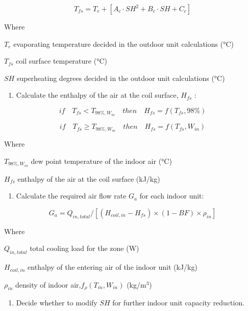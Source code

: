 \begin{equation}
T_{fs} = T_e+[A_c\cdot SH^2+B_c\cdot SH+C_c]
\end{equation}

Where

\(T_e\) evaporating temperature decided in the outdoor unit calculations (°C)

\(T_{fs}\) coil surface temperature (°C)

\(SH\) superheating degrees decided in the outdoor unit calculations (°C)

\begin{enumerate}
\def\labelenumi{\arabic{enumi})}
\setcounter{enumi}{1}
\tightlist
\item
  Calculate the enthalpy of the air at the coil surface, \(H_{fs}\) :
\end{enumerate}

\begin{equation}
if\quad{T_{fs}}<T_{98\%,W_{in}}\quad{then}\quad{H_{fs}} = f(T_{fs},98\%)
\end{equation}

\begin{equation}
if\quad{T_{fs}}\ge{T_{98\%,W_{in}}}\quad{then}\quad{H_{fs}} = f(T_{fs},W_{in})
\end{equation}

Where

\(T_{98\%,W_{in}}\) dew point temperature of the indoor air (°C)

\(H_{fs}\) enthalpy of the air at the coil surface (kJ/kg)

\begin{enumerate}
\def\labelenumi{\arabic{enumi})}
\setcounter{enumi}{2}
\tightlist
\item
  Calculate the required air flow rate \(G_a\) for each indoor unit:
\end{enumerate}

\begin{equation}
G_a = Q_{in,total}/[(H_{coil,in}-H_{fs})\times{(1-BF)}\times{\rho_{in}}]
\end{equation}

Where

\(Q_{in,total}\) total cooling load for the zone (W)

\(H_{coil,in}\) enthalpy of the entering air of the indoor unit (kJ/kg)

\(\rho_{in}\) density of indoor air,\(f_{\rho}(T_{in},W_{in})\) (kg/m\(^{3}\))

\begin{enumerate}
\def\labelenumi{\arabic{enumi})}
\setcounter{enumi}{3}
\tightlist
\item
  Decide whether to modify \(SH\) for further indoor unit capacity reduction.
\end{enumerate}


